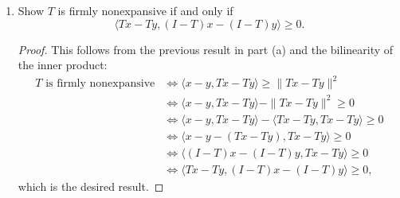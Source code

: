 \documentclass[11pt]{amsart}
\begin{document}
\begin{enumerate}
\begin{enumerate}
\begin{proof}
  ``$\Rightarrow$'': Suppose $\langle x-y, Tx - Ty \rangle \geq \|Tx - Ty\|^2$.

  ``$\Leftarrow$'': Suppose $T$ is firmly nonexpansive.


  Suppose $T$ is firmly nonexpansive.
  \begin{align*}
    \|Tx - Ty\|^2
    &+ \|(I-T) x - (I-T)y\|^2 \leq \|x-y\|^2 \\
    &\Leftrightarrow \|Tx - Ty\|^2 + \|(x-y)- (T x - T y)\|^2 \leq \|x-y\|^2 \\
    &\Leftrightarrow
      \|Tx - Ty\|^2 + \|(x-y)- (T x - T y)\|^2 \leq \|x-y\|^2 \\
    &\Leftrightarrow
      \|Tx - Ty\|^2 + \|x-y\|^2 + \|T x - T y)\|^2
      - 2\langle x - y, T x - T y\rangle \leq \|x-y\|^2 \\
    &\Leftrightarrow
      2\|Tx - Ty\|^2 \leq 2\langle x - y, T x - T y\rangle \\
    &\Leftrightarrow
      2\|Tx - Ty\|^2 \leq 2\langle x - y, T x - T y\rangle \\
    &\Leftrightarrow
      \langle x - y, T x - T y\rangle  \geq \|Tx - Ty\|^2,
  \end{align*}
  which is the desired result.
\end{proof}
\item Show $T$ is firmly nonexpansive if and only if 
\[
\langle Tx - Ty, (I-T)x - (I-T)y \rangle \geq 0. 
\]

\begin{proof}
  This follows from the previous result in part (a) and the bilinearity of the
  inner product:
  \begin{align*}
    \text{$T$ is firmly nonexpansive}
    &\Leftrightarrow \langle x-y, Tx - Ty \rangle \geq \|Tx - Ty\|^2 \\
    &\Leftrightarrow \langle x-y, Tx - Ty \rangle - \|Tx - Ty\|^2 \geq  0 \\
    &\Leftrightarrow \langle x-y, Tx - Ty \rangle - \langle Tx - Ty, Tx - Ty \rangle \geq  0 \\
    &\Leftrightarrow \langle x-y - (Tx - Ty), Tx - Ty \rangle \geq  0 \\
    &\Leftrightarrow \langle (I - T)x - (I - T)y, Tx - Ty \rangle \geq  0 \\
    &\Leftrightarrow \langle Tx - Ty, (I - T)x - (I - T)y \rangle \geq  0,
  \end{align*}
  which is the desired result.
\end{proof}


\end{enumerate}
\end{enumerate}
\end{document}
